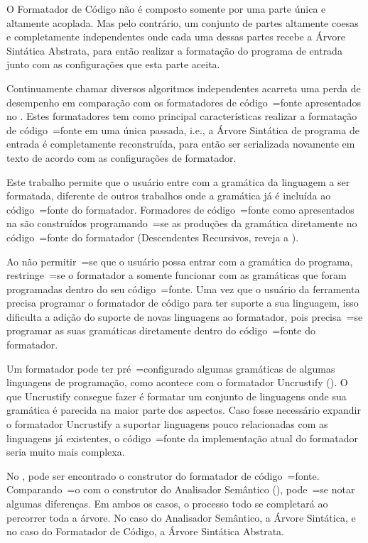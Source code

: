 O Formatador de Código não é composto somente por uma parte única e
altamente acoplada.
Mas pelo contrário,
um conjunto de partes altamente coesas e
completamente independentes onde cada uma dessas partes recebe a Árvore Sintática Abstrata,
para então realizar a formatação do programa de entrada junto com as configurações que esta parte aceita.

Continuamente chamar diversos algoritmos independentes acarreta uma perda de desempenho em comparação com os formatadores de código~=fonte apresentados no .
Estes formatadores tem como principal características realizar a formatação de código~=fonte em uma única passada,
i.e.,
a Árvore Sintática de programa de entrada é completamente reconstruída,
para então ser serializada novamente em texto de acordo com as configurações de formatador.

Este trabalho permite que o usuário entre com a gramática da linguagem a ser formatada,
diferente de outros trabalhos onde a gramática já é incluída ao código~=fonte do formatador.
Formadores de código~=fonte como apresentados na  são construídos programando~=se as produções da gramática diretamente no código~=fonte do formatador (Descendentes Recursivos,
reveja a ).

Ao não permitir~=se que o usuário possa entrar com a gramática do programa,
restringe~=se o formatador a somente funcionar com as gramáticas que foram programadas dentro do seu código~=fonte.
Uma vez que o usuário da ferramenta precisa programar o formatador de código para ter suporte a sua linguagem,
isso dificulta a adição do suporte de novas linguagens ao formatador,
pois precisa~=se programar as suas gramáticas diretamente dentro do código~=fonte do formatador.

Um formatador pode ter pré~=configurado algumas gramáticas de algumas linguagens de programação,
como acontece com o formatador Uncrustify ().
O que Uncrustify consegue fazer é formatar um conjunto de linguagens onde sua gramática é parecida na maior parte dos aspectos.
Caso fosse necessário expandir o formatador Uncrustify a suportar linguagens pouco relacionadas com as linguagens já existentes,
o código~=fonte da implementação atual do formatador seria muito mais complexa.

No ,
pode ser encontrado o construtor do formatador de código~=fonte.
Comparando~=o com o construtor do Analisador Semântico (),
pode~=se notar algumas diferenças.
Em ambos os casos,
o processo todo se completará ao percorrer toda a árvore.
No caso do Analisador Semântico,
a Árvore Sintática,
e no caso do Formatador de Código,
a Árvore Sintática Abstrata.

